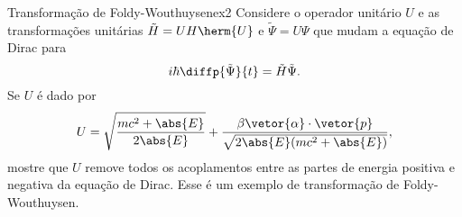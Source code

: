 \begin{exercício}{Transformação de Foldy-Wouthuysen}{ex2}
    Considere o operador unitário \(U\) e as transformações unitárias \(\tilde{H} = UH \herm{U}\) e \(\tilde{\Psi} = U\Psi\) que mudam a equação de Dirac para
    \begin{equation*}
        i\hbar \diffp{\tilde{\Psi}}{t} = \tilde{H} \tilde{\Psi}.
    \end{equation*}
    Se \(U\) é dado por
    \begin{equation*}
        U = \sqrt{\frac{mc^2 + \abs{E}}{2\abs{E}}} + \frac{\beta \vetor{\alpha}\cdot \vetor{p}}{\sqrt{2\abs{E}(mc^2 + \abs{E})}},
    \end{equation*}
    mostre que \(U\) remove todos os acoplamentos entre as partes de energia positiva e negativa da equação de Dirac. Esse é um exemplo de transformação de Foldy-Wouthuysen.
\end{exercício}
